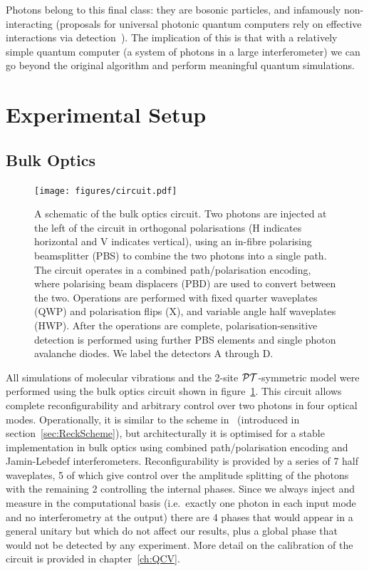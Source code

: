 Photons belong to this final class: they are bosonic particles, and infamously
non-interacting (proposals for universal photonic quantum computers rely on
effective interactions via detection~\cite{klm}). The implication of this is
that with a relatively simple quantum computer (a system of photons in a large
interferometer) we can go beyond the original \bosonsampling{} algorithm and
perform meaningful quantum simulations.

\section{Experimental Setup}
\subsection{Bulk Optics}
\label{sec:BulkReck}
\begin{figure}[t]
  \centering
  \texttt{[image: figures/circuit.pdf]}
  \caption[A schematic of the bulk optics circuit used for simulations.]
  {A schematic of the bulk optics circuit. Two photons are injected at
  the left of the circuit in orthogonal polarisations (H indicates
  horizontal and V indicates vertical), using an in-fibre polarising
  beamsplitter (PBS) to combine the two photons into a single path. The circuit
  operates in a combined path/polarisation encoding, where polarising beam
  displacers (PBD) are used to convert between the two. Operations are performed
  with fixed quarter waveplates (QWP) and polarisation flips (X), and variable
  angle half waveplates (HWP). After the operations are complete,
  polarisation-sensitive detection is performed using further PBS elements and
  single photon avalanche diodes. We label the detectors A through D.}
  \label{fig:circuit}
\end{figure}
All simulations of molecular vibrations and the 2-site \(\mathcal{PT}\)-symmetric model
were performed using the bulk optics circuit shown in
figure~\ref{fig:circuit}. This circuit allows complete reconfigurability and
arbitrary control over two photons in four optical modes. Operationally, it is
similar to the scheme in~\cite{reck} (introduced in
section~\ref{sec:ReckScheme}), but architecturally it is optimised for a stable
implementation in bulk optics using combined path/polarisation encoding and 
Jamin-Lebedef interferometers. Reconfigurability is provided by a series of 7
half waveplates, 5 of which give control over the amplitude splitting of the
photons with the remaining 2 controlling the internal phases. Since we always
inject and measure in the computational basis (i.e.\ exactly one photon in each
input mode and no interferometry at the output) there are 4 phases that would
appear in a general unitary but which do not affect our results, plus a global
phase that would not be detected by any experiment. More detail on the
calibration of the circuit is provided in chapter~\ref{ch:QCV}.

